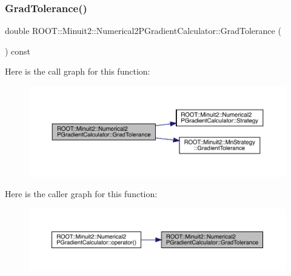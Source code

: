 \mbox{\label{classROOT_1_1Minuit2_1_1Numerical2PGradientCalculator_aa0011cbece7254c7e17f053916e01c65}} 
\subsubsection{\texorpdfstring{GradTolerance()}{GradTolerance()}\hspace{0.1cm}{\footnotesize\ttfamily [1/2]}}
{\footnotesize\ttfamily double R\+O\+O\+T\+::\+Minuit2\+::\+Numerical2\+P\+Gradient\+Calculator\+::\+Grad\+Tolerance (\begin{DoxyParamCaption}{ }\end{DoxyParamCaption}) const}

Here is the call graph for this function\+:\nopagebreak
\begin{figure}[H]
\begin{center}
\leavevmode
\includegraphics[width=350pt]{d0/d82/classROOT_1_1Minuit2_1_1Numerical2PGradientCalculator_aa0011cbece7254c7e17f053916e01c65_cgraph}
\end{center}
\end{figure}
Here is the caller graph for this function\+:\nopagebreak
\begin{figure}[H]
\begin{center}
\leavevmode
\includegraphics[width=350pt]{d0/d82/classROOT_1_1Minuit2_1_1Numerical2PGradientCalculator_aa0011cbece7254c7e17f053916e01c65_icgraph}
\end{center}
\end{figure}
\mbox{\label{classROOT_1_1Minuit2_1_1Numerical2PGradientCalculator_aa0011cbece7254c7e17f053916e01c65}} 
